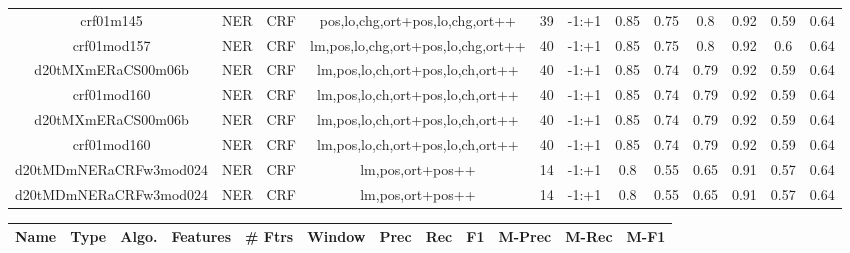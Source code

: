 \documentclass[a4paper]{article}
\begin{document}
\begin{landscape}
\begin{center}
\begin{tabular}{ |c|c|c|c|c|c|c|c|c|c|c|c|}
 
 	
 	\small{ crf01m145 } & \small{ NER} & \small{  CRF }  & pos,lo,chg,ort+pos,lo,chg,ort++  &  39 &  \small{  -1:+1 }  &  0.85 & 0.75 & 0.8  &  0.92 & 0.59 & 0.64 \\
 	

 
 	
 	\small{ crf01mod157 } & \small{ NER} & \small{  CRF }  & lm,pos,lo,chg,ort+pos,lo,chg,ort++  &  40 &  \small{  -1:+1 }  &  0.85 & 0.75 & 0.8  &  0.92 & 0.6 & 0.64 \\
 	

 
 	
 	\small{ d20tMXmERaCS00m06b } & \small{ NER} & \small{  CRF }  & lm,pos,lo,ch,ort+pos,lo,ch,ort++  &  40 &  \small{  -1:+1 }  &  0.85 & 0.74 & 0.79  &  0.92 & 0.59 & 0.64 \\
 	

 
 	
 	\small{ crf01mod160 } & \small{ NER} & \small{  CRF }  & lm,pos,lo,ch,ort+pos,lo,ch,ort++  &  40 &  \small{  -1:+1 }  &  0.85 & 0.74 & 0.79  &  0.92 & 0.59 & 0.64 \\
 	

 
 	
 	\small{ d20tMXmERaCS00m06b } & \small{ NER} & \small{  CRF }  & lm,pos,lo,ch,ort+pos,lo,ch,ort++  &  40 &  \small{  -1:+1 }  &  0.85 & 0.74 & 0.79  &  0.92 & 0.59 & 0.64 \\
 	

 
 	
 	\small{ crf01mod160 } & \small{ NER} & \small{  CRF }  & lm,pos,lo,ch,ort+pos,lo,ch,ort++  &  40 &  \small{  -1:+1 }  &  0.85 & 0.74 & 0.79  &  0.92 & 0.59 & 0.64 \\
 	

 
 	
 	\small{ d20tMDmNERaCRFw3mod024 } & \small{ NER} & \small{  CRF }  & lm,pos,ort+pos++  &  14 &  \small{  -1:+1 }  &  0.8 & 0.55 & 0.65  &  0.91 & 0.57 & 0.64 \\
 	

 
 	
 	\small{ d20tMDmNERaCRFw3mod024 } & \small{ NER} & \small{  CRF }  & lm,pos,ort+pos++  &  14 &  \small{  -1:+1 }  &  0.8 & 0.55 & 0.65  &  0.91 & 0.57 & 0.64 \\
 	
 \hline
\end{tabular}
\end{center}




\begin{center}
\begin{tabular}{ |c|c|c|c|c|c|c|c|c|c|c|c|} 
 \hline
 	Name & Type & Algo. & Features & \# Ftrs & Window & Prec & Rec & F1 & M-Prec & M-Rec & M-F1\\
 \hline


\end{tabular}
\end{center}
\end{landscape}
\end{document}
